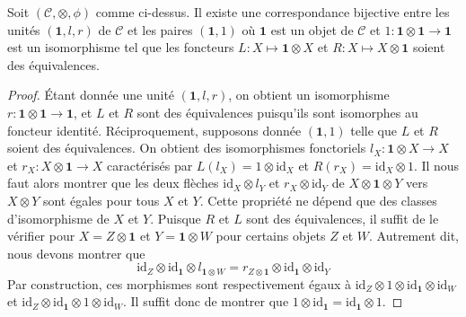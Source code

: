 \begin{lemma}
\label{lemma-monoidal-unit}
Soit $(\mathcal{C}, \otimes, \phi)$ comme ci-dessus. Il existe une
correspondance bijective entre les unités $(\mathbf{1}, l, r)$ de $\mathcal{C}$
et les paires $(\mathbf{1}, 1)$ où $\mathbf{1}$ est un objet de $\mathcal{C}$ et
$1 : \mathbf{1} \otimes \mathbf{1} \to \mathbf{1}$
est un isomorphisme tel que les foncteurs
$L : X \mapsto \mathbf{1} \otimes X$
et $R : X \mapsto X \otimes \mathbf{1}$ soient des équivalences.
\end{lemma}

\begin{proof}
Étant donnée une unité $(\mathbf{1}, l, r)$, on obtient un isomorphisme
$r : \mathbf{1} \otimes \mathbf{1} \to \mathbf{1}$, et $L$ et $R$ sont
des équivalences puisqu'ils sont isomorphes au foncteur identité.
Réciproquement, supposons donnée $(\mathbf{1}, 1)$ telle que
$L$ et $R$ soient des équivalences. On obtient des isomorphismes fonctoriels
$l_X : \mathbf{1} \otimes X \to X$ et $r_X : X \otimes \mathbf{1} \to X$
caractérisés par $L(l_X) = 1 \otimes \text{id}_X$ et
$R(r_X) = \text{id}_X \otimes 1$. Il nous faut alors montrer que les deux
flèches $\text{id}_X \otimes l_Y$ et $r_X \otimes \text{id}_Y$ de
$X \otimes \mathbf{1} \otimes Y$ vers $X \otimes Y$ sont égales
pour tous $X$ et $Y$. Cette propriété ne dépend que des classes d'isomorphisme
de $X$ et $Y$.
Puisque $R$ et $L$ sont des équivalences, il suffit de
le vérifier pour $X = Z \otimes \mathbf{1}$ et $Y = \mathbf{1} \otimes W$
pour certains objets $Z$ et $W$.
Autrement dit, nous devons montrer que
$$
\text{id}_Z \otimes \text{id}_\mathbf{1} \otimes l_{\mathbf{1} \otimes W}
=
r_{Z \otimes \mathbf{1}} \otimes \text{id}_\mathbf{1} \otimes \text{id}_Y
$$
Par construction, ces morphismes sont respectivement égaux à
$\text{id}_Z \otimes 1 \otimes \text{id}_\mathbf{1} \otimes \text{id}_W$ et
$\text{id}_Z \otimes \text{id}_\mathbf{1} \otimes 1 \otimes \text{id}_W$.
Il suffit donc de montrer que
$1 \otimes \text{id}_\mathbf{1} = \text{id}_\mathbf{1} \otimes 1$.


\end{proof}
